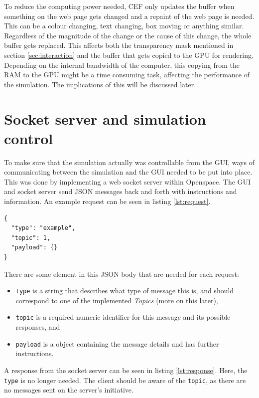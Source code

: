 To reduce the computing power needed, CEF only updates the buffer when something on the web page gets changed and a repaint of the web page is needed. This can be a colour changing, text changing, box moving or anything similar. Regardless of the magnitude of the change or the cause of this change, the whole buffer gets replaced. This affects both the transparency mask mentioned in section \ref{sec:interaction} and the buffer that gets copied to the GPU for rendering. Depending on the internal bandwidth of the computer, this copying from the RAM to the GPU might be a time consuming task, affecting the performance of the simulation. The implications of this will be discussed later. 

\section{Socket server and simulation control}

To make sure that the simulation actually was controllable from the GUI, ways of communicating between the simulation and the GUI needed to be put into place. This was done by implementing a web socket server within Openspace. The GUI and socket server send JSON messages back and forth with instructions and information. An example request can be seen in listing \ref{lst:request}.

\begin{lstlisting}[caption={Example request sent by the GUI},label=lst:request]
{
  "type": "example",
  "topic": 1,
  "payload": {}
}
\end{lstlisting}

There are some element in this JSON body that are needed for each request:

\begin{itemize}
\item \texttt{type} is a string that describes what type of message this is, and should correspond to one of the implemented \emph{Topics} (more on this later),
\item \texttt{topic} is a required numeric identifier for this message and its possible responses, and
\item \texttt{payload} is a object containing the message details and has further instructions.
\end{itemize}

A response from the socket server can be seen in listing \ref{lst:response}. Here, the \texttt{type} is no longer needed. The client should be aware of the \texttt{topic}, as there are no messages sent on the server's initiative.

